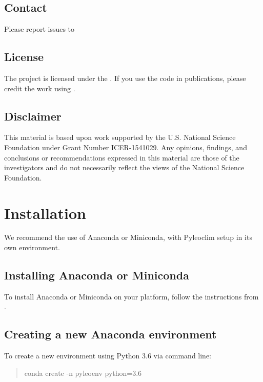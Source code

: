 \documentclass[letterpaper,10pt,english]{sphinxmanual}
\begin{document}
\section{Contact}
\label{\detokenize{Introduction:contact}}
Please report issues to 


\section{License}
\label{\detokenize{Introduction:license}}
The project is licensed under the  .
If you use the code in publications, please credit the work using .


\section{Disclaimer}
\label{\detokenize{Introduction:disclaimer}}
This material is based upon work supported by the U.S. National Science Foundation under Grant Number
ICER-1541029. Any opinions, findings, and conclusions or recommendations expressed in this material are those
of the investigators and do not necessarily reflect the views of the National Science Foundation.


\chapter{Installation}
\label{\detokenize{Installation:installation}}\label{\detokenize{Installation::doc}}
We recommend the use of Anaconda or Miniconda, with Pyleoclim setup in
its own environment.


\section{Installing Anaconda or Miniconda}
\label{\detokenize{Installation:installing-anaconda-or-miniconda}}
To install Anaconda or Miniconda on your platform, follow the instructions from .


\section{Creating a new Anaconda environment}
\label{\detokenize{Installation:creating-a-new-anaconda-environment}}
To create a new environment using Python 3.6 via command line:
\begin{quote}

conda create -n pyleoenv python=3.6
\end{quote}
\end{document}
